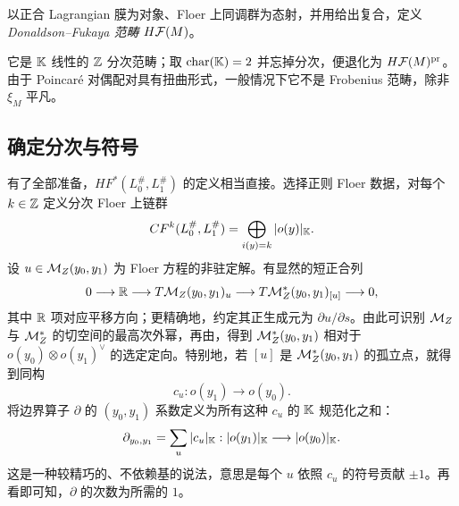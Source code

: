\begin{definition*}
以正合 Lagrangian 膜为对象、Floer 上同调群为态射，并用给出复合，定义 \emph{Donaldson–Fukaya 范畴} $H\mathcal F(M)$。
\end{definition*}
它是 $\mathbb K$ 线性的 $\mathbb Z$ 分次范畴；取 $\operatorname{char}(\mathbb K)=2$ 并忘掉分次，便退化为 $H\mathcal F(M)^{\mathrm{pr}}$。由于 Poincaré 对偶配对具有扭曲形式，一般情况下它不是 Frobenius 范畴，除非 $\xi_M$ 平凡。

\subsection{确定分次与符号}\label{sec:12f}
有了全部准备，$HF^*(L_0^\#,\allowbreak L_1^\#)$ 的定义相当直接。选择正则 Floer 数据，对每个 $k\in\mathbb Z$ 定义分次 Floer 上链群
\begin{equation}\label{eq:12.16}
CF^k(L_0^\#,L_1^\#)=\bigoplus_{i(y)=k}|o(y)|_{\mathbb K}.
\end{equation}
设 $u\in\mathcal M_Z(y_0,\allowbreak y_1)$ 为 Floer 方程的非驻定解。有显然的短正合列
\[
0\longrightarrow\mathbb R\longrightarrow T\mathcal M_Z(y_0,y_1)_u\longrightarrow T\mathcal M_Z^*(y_0,y_1)_{[u]}\longrightarrow0,
\]
其中 $\mathbb R$ 项对应平移方向；更精确地，约定其正生成元为 $\partial u/\partial s$。由此可识别 $\mathcal M_Z$ 与 $\mathcal M_Z^*$ 的切空间的最高次外幂，再由，得到 $\mathcal M_Z^*(y_0,\allowbreak y_1)$ 相对于 $o(y_0)\otimes o(y_1)^\vee$ 的选定定向。特别地，若 $[u]$ 是 $\mathcal M_Z^*(y_0,\allowbreak y_1)$ 的孤立点，就得到同构
\begin{equation}\label{eq:12.17}
c_u:o(y_1)\longrightarrow o(y_0).
\end{equation}
将边界算子 $\partial$ 的 $(y_0,\allowbreak y_1)$ 系数定义为所有这种 $c_u$ 的 $\mathbb K$ 规范化之和：
\begin{equation}\label{eq:12.18}
\partial_{y_0,y_1}=\sum_u|c_u|_{\mathbb K}:|o(y_1)|_{\mathbb K}\longrightarrow|o(y_0)|_{\mathbb K}.
\end{equation}
这是一种较精巧的、不依赖基的说法，意思是每个 $u$ 依照 $c_u$ 的符号贡献 $\pm1$。再看即可知，$\partial$ 的次数为所需的 $1$。

